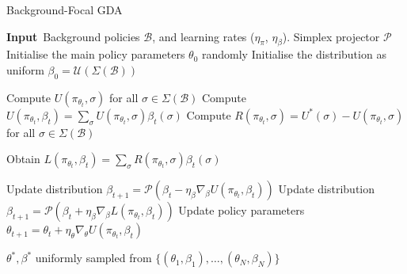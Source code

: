 \begin{algorithm}[t]

\caption{Background-Focal GDA}
\label{algorithm:full_information_gda}

\begin{algorithmic}[1]
\STATE \textbf{Input\,} 
Background policies $\mathcal{B}$, 
and
learning rates ($\eta_\pi$, $\eta_\beta$).
\STATE Simplex projector $\mathcal{P}$
\STATE Initialise the main policy parameters $\theta_0$ randomly
\STATE Initialise the distribution as uniform $\beta_0 = \mathcal{U}(\Sigma(\mathcal{B}))$ 


    \STATE Compute $U(\pi_{\theta_t}, \sigma)$ for all $\sigma \in \Sigma(\mathcal{B})$
    \STATE Compute $U(\pi_{\theta_t}, \beta_t) = \sum_\sigma U(\pi_{\theta_t}, \sigma) \beta_t(\sigma)$
    \STATE Compute $R(\pi_{\theta_t}, \sigma) = U^*(\sigma) - U(\pi_{\theta_t}, \sigma)$ for all $\sigma \in \Sigma(\mathcal{B})$

    \STATE Obtain $L(\pi_{\theta_t}, \beta_t) = \sum_\sigma R(\pi_{\theta_t}, \sigma)\beta_t(\sigma)$

        \STATE Update distribution $\beta_{t+1} = \mathcal{P}(\beta_t -\eta_{\beta}\nabla_{\beta} U(\pi_{\theta_t}, \beta_t))$
    \ENDIF
        \STATE Update distribution $\beta_{t+1} = \mathcal{P}(\beta_t + \eta_{\beta}\nabla_{\beta} L(\pi_{\theta_t}, \beta_t))$
    \ENDIF
    \STATE Update policy parameters $\theta_{t+1} = \theta_t + \eta_{\theta}\nabla_{\theta} U(\pi_{\theta_t}, \beta_t)$
\ENDFOR

\RETURN $\theta^*, \beta^*$ uniformly sampled from $\{(\theta_1, \beta_1), \dots, (\theta_N, \beta_N)\}$
\end{algorithmic}
\end{algorithm}